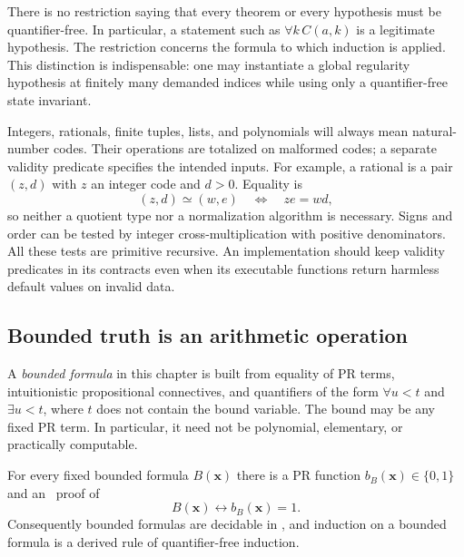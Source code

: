 There is no restriction saying that every theorem or every hypothesis must be
quantifier-free.  In particular, a statement such as
$\forall k\,C(a,k)$ is a legitimate hypothesis.  The restriction concerns the
formula to which induction is applied.  This distinction is indispensable:
one may instantiate a global regularity hypothesis at finitely many demanded
indices while using only a quantifier-free state invariant.

Integers, rationals, finite tuples, lists, and polynomials will always mean
natural-number codes.  Their operations are totalized on malformed codes; a
separate validity predicate specifies the intended inputs.  For example, a
rational is a pair $(z,d)$ with $z$ an integer code and $d>0$.  Equality is
\[
 (z,d)\simeq(w,e)\quad\Longleftrightarrow\quad ze=wd,
\]
so neither a quotient type nor a normalization algorithm is necessary.  Signs
and order can be tested by integer cross-multiplication with positive
denominators.  All these tests are primitive recursive.  An implementation
should keep validity predicates in its contracts even when its executable
functions return harmless default values on invalid data.

\subsection{Bounded truth is an arithmetic operation}
\label{sec:bounded-truth}

A \emph{bounded formula} in this chapter is built from equality of PR terms,
intuitionistic propositional connectives, and quantifiers of the form
$\forall u<t$ and $\exists u<t$, where $t$ does not contain the bound variable.
The bound may be any fixed PR term.  In particular, it need not be polynomial,
elementary, or practically computable.

\begin{lemma}
\label{lem:bounded-booleanization}
For every fixed bounded formula $B(\boldsymbol x)$ there is a PR function
$b_B(\boldsymbol x)\in\{0,1\}$ and an \ipra\ proof of
\[
 B(\boldsymbol x)\longleftrightarrow b_B(\boldsymbol x)=1.
\]
Consequently bounded formulas are decidable in \ipra, and induction on a
bounded formula is a derived rule of quantifier-free induction.
\end{lemma}

